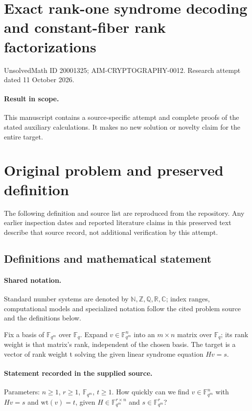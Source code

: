 \documentclass[11pt]{article}
\begin{document}
\section*{Exact rank-one syndrome decoding and constant-fiber rank factorizations}
\noindent UnsolvedMath ID 20001325; AIM-CRYPTOGRAPHY-0012. Research attempt dated 11 October 2026.
\paragraph{Result in scope.}This manuscript contains a source-specific attempt and complete proofs of the stated auxiliary calculations. It makes no new solution or novelty claim for the entire target.
\section{Original problem and preserved definition}
The following definition and source list are reproduced from the repository. Any earlier inspection dates and reported literature claims in this preserved text describe that source record, not additional verification by this attempt.
\subsection{Definitions and mathematical statement}

\paragraph{Shared notation.}Standard number systems are denoted by $\mathbb N,\mathbb Z,\mathbb Q,\mathbb R,\mathbb C$; index ranges, computational models and specialized notation follow the cited problem source and the definitions below.


Fix a basis of $\mathbb F_{q^m}$ over $\mathbb F_q$. Expand $v\in\mathbb F_{q^m}^n$ into an $m\times n$ matrix over $\mathbb F_q$; its rank weight is that matrix's rank, independent of the chosen basis. The target is a vector of rank weight t solving the given linear syndrome equation $Hv=s$.
\paragraph{Statement recorded in the supplied source.}
Parameters: $n \geq 1$, $r\geq 1$, $\mathbb F_{q^m}$, $t \geq 1$. How quickly can we find $v\in \mathbb F_{q^m}^n$ with $Hv = s$ and $\text{wt}(v) = t$, given $H\in \mathbb F_{q^m}^{r\times n}$ and $s\in \mathbb F_{q^m}^r$?
\end{document}

